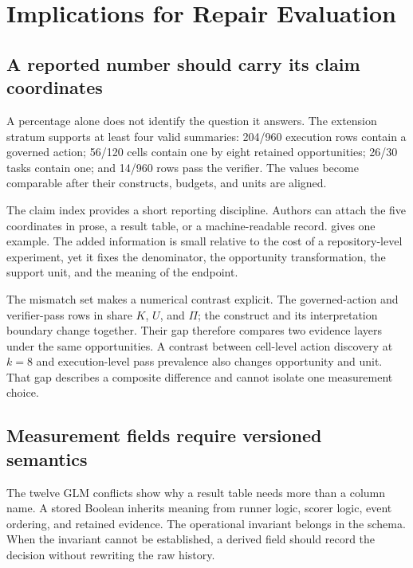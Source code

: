 \section{Implications for Repair Evaluation}
\label{sec:implications}

\subsection{A reported number should carry its claim coordinates}

A percentage alone does not identify the question it answers. The extension stratum supports at least four valid summaries: 204/960 execution rows contain a governed action; 56/120 cells contain one by eight retained opportunities; 26/30 tasks contain one; and 14/960 rows pass the verifier. The values become comparable after their constructs, budgets, and units are aligned.

The claim index provides a short reporting discipline. Authors can attach the five coordinates in prose, a result table, or a machine-readable record.  gives one example. The added information is small relative to the cost of a repository-level experiment, yet it fixes the denominator, the opportunity transformation, the support unit, and the meaning of the endpoint.



The mismatch set makes a numerical contrast explicit. The governed-action and verifier-pass rows in  share $K$, $U$, and $\Pi$; the construct and its interpretation boundary change together. Their gap therefore compares two evidence layers under the same opportunities. A contrast between cell-level action discovery at $k=8$ and execution-level pass prevalence also changes opportunity and unit. That gap describes a composite difference and cannot isolate one measurement choice.

\subsection{Measurement fields require versioned semantics}

The twelve GLM conflicts show why a result table needs more than a column name. A stored Boolean inherits meaning from runner logic, scorer logic, event ordering, and retained evidence. The operational invariant belongs in the schema. When the invariant cannot be established, a derived field should record the decision without rewriting the raw history.


